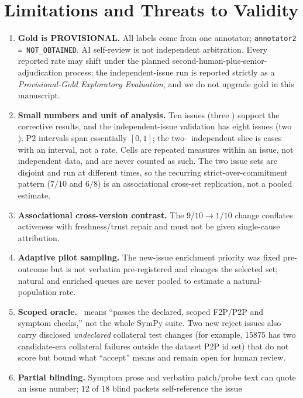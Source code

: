 \section{Limitations and Threats to Validity}
\label{sec:threats}

\begin{enumerate}[leftmargin=1.7em,itemsep=3pt,topsep=3pt]
  \item \textbf{Gold is PROVISIONAL.} All labels come from one annotator;
  \texttt{annotator2 = NOT\_OBTAINED}. AI self-review is not independent
  arbitration. Every reported rate may shift under the planned
  second-human-plus-senior-adjudication process; the independent-issue run is
  reported strictly as a \emph{Provisional-Gold Exploratory Evaluation}, and
  we do not upgrade gold in this manuscript.
  \item \textbf{Small numbers and unit of analysis.} Ten issues (three
  \REJECT) support the corrective results, and the independent-issue
  validation has eight issues (two \REJECT). P2 intervals span essentially
  $[0,1]$; the two-\REJECT\ independent slice is cases with an interval, not a
  rate. Cells are repeated measures within an issue, not independent data,
  and are never counted as such. The two issue sets are disjoint and run at
  different times, so the recurring strict-over-commitment pattern
  ($7/10$ and $6/8$) is an associational cross-set replication, not a pooled
  estimate.
  \item \textbf{Associational cross-version contrast.} The $9/10\to1/10$
  change conflates activeness with freshness/trust repair and must not be given
  single-cause attribution.
  \item \textbf{Adaptive pilot sampling.} The new-issue enrichment priority was
  fixed pre-outcome but is not verbatim pre-registered and changes the selected
  set; natural and enriched queues are never pooled to estimate a
  natural-population rate.
  \item \textbf{Scoped oracle.} \ACCEPT\ means ``passes the declared, scoped
  F2P/P2P and symptom checks,'' not the whole SymPy suite. Two new reject
  issues also carry disclosed \emph{undeclared} collateral test changes (for
  example, 15875 has two candidate-era collateral failures outside the dataset
  P2P id set) that do not score but bound what ``accept'' means and remain open
  for human review.
  \item \textbf{Partial blinding.} Symptom prose and verbatim patch/probe text
  can quote an issue number; 12 of 18 blind packets self-reference the issue

\end{enumerate}
